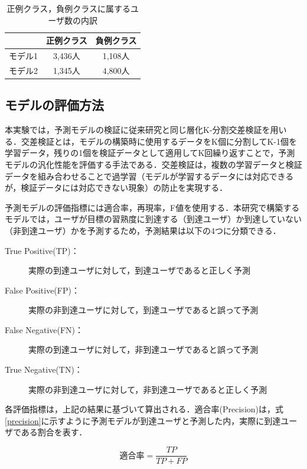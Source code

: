 \documentclass[11pt,dvipdfmx]{jreport}
\begin{document}
\begin{table}
  \caption{正例クラス，負例クラスに属するユーザ数の内訳}
  \label{tab:user-class}
  \centering
  \begin{tabular}{|c|c|c|}
    \hline
     & 正例クラス & 負例クラス\\
    \hline
    モデル1 & 3,436人 & 1,108人 \\
    \hline
    モデル2 & 1,345人 & 4,800人 \\
    \hline
  \end{tabular}
\end{table}

\subsection{モデルの評価方法}
本実験では，予測モデルの検証に従来研究と同じ層化K-分割交差検証を用いる．交差検証とは，モデルの構築時に使用するデータをK個に分割してK-1個を学習データ，残りの1個を検証データとして適用してK回繰り返すことで，予測モデルの汎化性能を評価する手法である．交差検証は，複数の学習データと検証データを組み合わせることで過学習（モデルが学習するデータには対応できるが，検証データには対応できない現象）の防止を実現する．

予測モデルの評価指標には適合率，再現率，F値を使用する．本研究で構築するモデルでは，ユーザが目標の習熟度に到達する（到達ユーザ）か到達していない（非到達ユーザ）かを予測するため，予測結果は以下の4つに分類できる．

\begin{description}
\item [True Positive(TP)：]実際の到達ユーザに対して，到達ユーザであると正しく予測
\item [False Positive(FP)：]実際の非到達ユーザに対して，到達ユーザであると誤って予測
\item [False Negative(FN)：]実際の到達ユーザに対して，非到達ユーザであると誤って予測
\item [True Negative(TN)：]実際の非到達ユーザに対して，非到達ユーザであると正しく予測
\end{description}

各評価指標は，上記の結果に基づいて算出される．適合率(Precision)は，式\ref{precision}に示すように予測モデルが到達ユーザと予測した内，実際に到達ユーザである割合を表す．

\begin{equation}
  適合率 = \frac{TP}{TP + FP} \label{precision}
\end{equation}
\vspace{.5mm}
\end{document}
